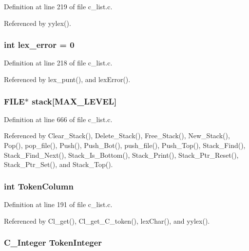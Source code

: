 Definition at line 219 of file c\_\-list.c.

Referenced by yylex().
\subsubsection{\setlength{\rightskip}{0pt plus 5cm}int \bf{lex\_\-error} = 0\hspace{0.3cm}{\tt  [static]}}\label{c__list_8c_814c1953c80a71fb62fbc43f524d6914}




Definition at line 218 of file c\_\-list.c.

Referenced by lex\_\-punt(), and lex\-Error().
\subsubsection{\setlength{\rightskip}{0pt plus 5cm}FILE$\ast$ \bf{stack}[MAX\_\-LEVEL]\hspace{0.3cm}{\tt  [static]}}\label{c__list_8c_ec647b16f5623906de8a6cef44727e7f}




Definition at line 666 of file c\_\-list.c.

Referenced by Clear\_\-Stack(), Delete\_\-Stack(), Free\_\-Stack(), New\_\-Stack(), Pop(), pop\_\-file(), Push(), Push\_\-Bot(), push\_\-file(), Push\_\-Top(), Stack\_\-Find(), Stack\_\-Find\_\-Next(), Stack\_\-Is\_\-Bottom(), Stack\_\-Print(), Stack\_\-Ptr\_\-Reset(), Stack\_\-Ptr\_\-Set(), and Stack\_\-Top().
\subsubsection{\setlength{\rightskip}{0pt plus 5cm}int \bf{Token\-Column}\hspace{0.3cm}{\tt  [static]}}\label{c__list_8c_b99d16ace4a8bdcb65ea9f06092b4940}




Definition at line 191 of file c\_\-list.c.

Referenced by Cl\_\-get(), Cl\_\-get\_\-C\_\-token(), lex\-Char(), and yylex().
\subsubsection{\setlength{\rightskip}{0pt plus 5cm}\bf{C\_\-Integer} \bf{Token\-Integer}\hspace{0.3cm}{\tt  [static]}}\label{c__list_8c_9ded05e944884cff9bdda5ef7ec5cb55}




